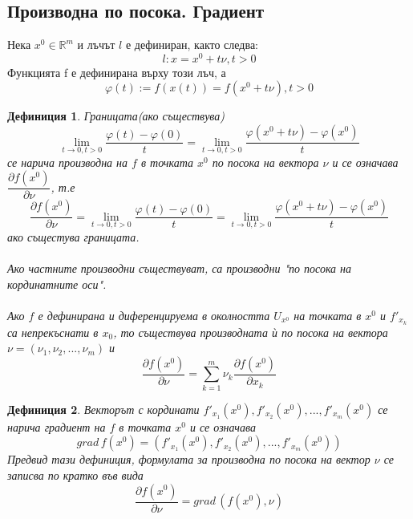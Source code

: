 \documentclass[a4paper,fleqn,12pt]{article}
\newtheorem{definition}{Дефиниция}[subsection]
\theoremstyle{definition}
\begin{document}
\subsection{Производна по посока. Градиент}
Нека $x^0 \in \mathbb{R}^m$ и лъчът $l$ е дефиниран, както следва: $$l:x = x^0 + t\nu, t > 0$$
Функцията f е дефинирана върху този лъч, а $$\varphi(t) := f(x(t)) = f(x^0 + t\nu), t > 0$$

\begin{definition}
Границата(ако съществува) 
$$\lim\limits_{t \to 0, t > 0} \dfrac{\varphi(t) - \varphi(0)}{t} = \lim\limits_{t \to 0, t > 0} \dfrac{\varphi(x^0 + t\nu) - \varphi(x^0)}{t} $$
се нарича производна на $f$ в точката $x^0$ по посока на вектора $\nu$ и се означава $\dfrac{\partial f(x^0)}{\partial \nu}$, т.е
$$\dfrac{\partial f(x^0)}{\partial \nu} = \lim\limits_{t \to 0, t > 0} \dfrac{\varphi(t) - \varphi(0)}{t} = \lim\limits_{t \to 0, t > 0} \dfrac{\varphi(x^0 + t\nu) - \varphi(x^0)}{t}$$ ако същестува границата.\\
\\
Ако частните производни съществуват, са производни "по посока на кординатните оси". \\
\\
Ако $f$ е дефинирана и диференцируема в околността $U_{x^0}$ на точката в $x^0$ и $f'_{x_k}$ са непрекъснати в $x_0$, то съществува производната ѝ по посока на вектора $\nu = (\nu_1, \nu_2, ..., \nu_m)$ и 
$$\dfrac{\partial f(x^0)}{\partial \nu} = \sum_{k = 1} ^m \nu_k \dfrac{\partial f(x^0)}{\partial x_k}$$
\end{definition}

\begin{definition}
Векторът с кординати $f'_{x_1}(x^0), f'_{x_2}(x^0), ..., f'_{x_m}(x^0)$ се нарича градиент на $f$ в точката $x^0$ и се означава 
$$grad \, f(x^0) = (f'_{x_1}(x^0), f'_{x_2}(x^0), ..., f'_{x_m}(x^0))$$
Предвид тази дефиниция, формулата за производна по посока на вектор $\nu$ се записва по кратко във вида
$$\dfrac{\partial f(x^0)}{\partial \nu} = grad \, (f(x^0), \nu)$$
\end{definition}
\end{document}
